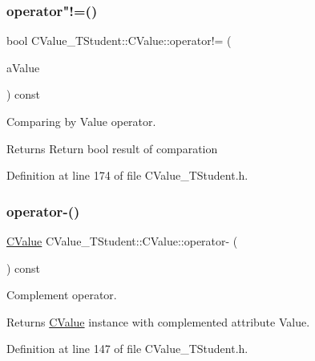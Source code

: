\subsubsection{\texorpdfstring{operator"!=()}{operator!=()}}
{\footnotesize\ttfamily bool C\+Value\+\_\+\+T\+Student\+::\+C\+Value\+::operator!= (\begin{DoxyParamCaption}\item[{const \hyperlink{class_c_value___t_student_1_1_c_value}{C\+Value} \&}]{a\+Value }\end{DoxyParamCaption}) const\hspace{0.3cm}{\ttfamily [inline]}}



Comparing by Value operator. 

\begin{DoxyReturn}{Returns}
Return {\ttfamily bool} result of comparation 
\end{DoxyReturn}


Definition at line 174 of file C\+Value\+\_\+\+T\+Student.\+h.

\mbox{\label{class_c_value___t_student_1_1_c_value_a7659b2e85b6f304c7a83e2ef4f4c3f8d}} 
\subsubsection{\texorpdfstring{operator-\/()}{operator-()}}
{\footnotesize\ttfamily \hyperlink{class_c_value___t_student_1_1_c_value}{C\+Value} C\+Value\+\_\+\+T\+Student\+::\+C\+Value\+::operator-\/ (\begin{DoxyParamCaption}{ }\end{DoxyParamCaption}) const\hspace{0.3cm}{\ttfamily [inline]}}



Complement operator. 

\begin{DoxyReturn}{Returns}
\hyperlink{class_c_value___t_student_1_1_c_value}{C\+Value} instance with complemented attribute Value. 
\end{DoxyReturn}


Definition at line 147 of file C\+Value\+\_\+\+T\+Student.\+h.

